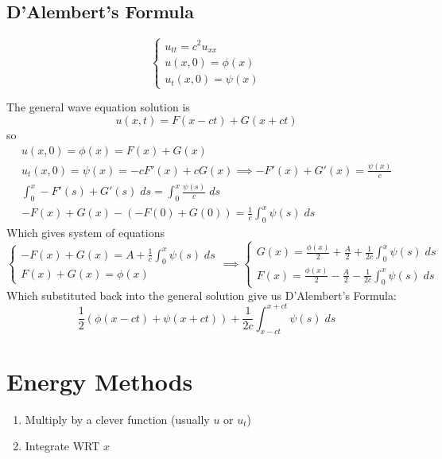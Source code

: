 \documentclass[10pt]{article}
\begin{document}
\subsection{D'Alembert's Formula}
\[\begin{cases}
    u_{tt} = c^2 u_{xx}\\
    u(x, 0) = \phi(x)\\
    u_t(x, 0) = \psi(x)
\end{cases}\]

The general wave equation solution is 
\[u(x, t) = F(x - ct) + G(x + ct)\] 
so 
\begin{gather*}
    u(x, 0) = \phi(x) = F(x) + G(x)\\
    u_t(x, 0) = \psi(x) = -cF'(x) + cG(x) \implies -F'(x) + G'(x) = \frac{\psi(x)}{c}\\
    \int_0^x - F'(s) + G'(s)\; ds = \int_0^x \frac{\psi(s)}{c}\; ds\\
    -F(x) + G(x) - (-F(0) + G(0)) = \frac{1}{c}\int_0^x \psi(s)\; ds
\end{gather*}
Which gives system of equations 
\[\begin{cases*}
    -F(x) + G(x) = A + \frac{1}{c}\int_0^x \psi(s)\; ds\\
    F(x) + G(x) = \phi(x)\end{cases*}\implies \begin{cases*}
        G(x) = \frac{\phi(x)}{2} + \frac{A}{2} + \frac{1}{2c}\int_0^x \psi(s)\; ds\\
        F(x) = \frac{\phi(x)}{2} - \frac{A}{2} - \frac{1}{2c}\int_0^x \psi(s)\; ds
    \end{cases*}\]
Which substituted back into the general solution give us D'Alembert's Formula:
\[\frac{1}{2}(\phi(x - ct) + \psi(x + ct)) + \frac{1}{2c}\int_{x-ct}^{x+ct}\psi(s)\; ds\]

\section{Energy Methods}
\begin{enumerate}
    \item Multiply by a clever function (usually $u$ or $u_t$)
    \item Integrate WRT $x$
\end{enumerate}
\end{document}
